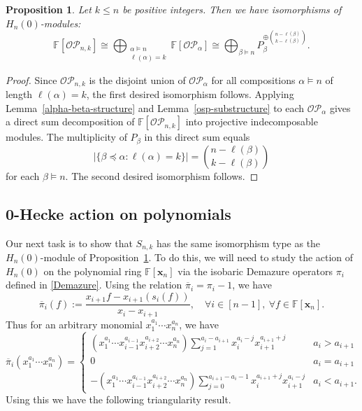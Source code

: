 \documentclass[10pt]{amsart}
\newtheorem{proposition}[theorem]{Proposition}
\theoremstyle{definition}
\newcommand{\OP}{{\mathcal{OP}}}
\newcommand{\FF}{{\mathbb{F}}}
\newcommand{\xx}{{\mathbf {x}}}
\newcommand{\pib}{\overline{\pi}}
\begin{document}
\begin{proposition}
\label{osp-structure}
Let $k \leq n$ be positive integers. 
Then we have isomorphisms of $H_n(0)$-modules:
\begin{equation}
\FF[\OP_{n,k}] \cong \bigoplus_{\substack{ \alpha\models n \\ \ell(\alpha)=k }} \FF[\OP_\alpha] \cong \bigoplus_{\beta \models n} P_{\beta}^{\oplus{n - \ell(\beta) \choose k - \ell(\beta)}}.
\end{equation}
\end{proposition}

\begin{proof}
Since $\OP
_{n,k}$ is the disjoint union of $\OP_{\alpha}$ for all compositions $\alpha\models n$ of length $\ell(\alpha)=k$, the first desired isomorphism follows.
Applying Lemma~\ref{alpha-beta-structure} and Lemma~\ref{osp-substructure} to each $\OP_{\alpha}$ gives a direct sum decomposition of $\FF[\OP_{n,k}]$ into projective indecomposable modules.
The multiplicity of $P_\beta$ in this direct sum equals 
\[ |\{\beta\preceq\alpha: \ell(\alpha)=k\}| = { n-\ell(\beta) \choose k-\ell(\beta) }\]
for each $\beta\models n$. 
The second desired isomorphism follows.
\end{proof}
\subsection{0-Hecke action on polynomials}
Our next task is to show that $S_{n,k}$ has the same isomorphism type as the $H_n(0)$-module of 
Proposition~\ref{osp-structure}.
To do this, we will need to study the action of $H_n(0)$ on the polynomial ring $\FF[\xx_n]$ via the isobaric Demazure operators $\pi_i$ defined in \eqref{Demazure}.
Using the relation $\pib_i=\pi_i-1$, we have
\[ \pib_i(f) := \frac{x_{i+1} f - x_{i+1} (s_i(f))}{x_i - x_{i+1}},\quad \forall i\in[n-1],\ \forall f\in\FF[\xx_n]. \]
Thus for an arbitrary monomial $x_1^{a_1} \cdots x_n^{a_n}$, we have 
\begin{equation}\label{pi-bar}
\pib_i(x_1^{a_1} \cdots x_n^{a_n}) = \begin{cases}
\displaystyle (x_1^{a_1} \cdots x_{i-1}^{a_{i-1}} x_{i+2}^{a_{i+2}} \cdots x_n^{a_n}) \sum_{j = 1}^{a_i - a_{i+1}} x_i^{a_i - j} x_{i+1}^{a_{i+1}+j} & a_i > a_{i+1} \\
0 & a_i = a_{i+1} \\
\displaystyle -(x_1^{a_1} \cdots x_{i-1}^{a_{i-1}} x_{i+2}^{a_{i+2}} \cdots x_n^{a_n})   \sum_{j = 0}^{a_{i+1} - a_i-1} x_i^{a_{i+1} + j} x_{i+1}^{a_i - j} & a_i<a_{i+1}.
\end{cases} 
\end{equation}
Using this we have the following triangularity result.
\end{document}
